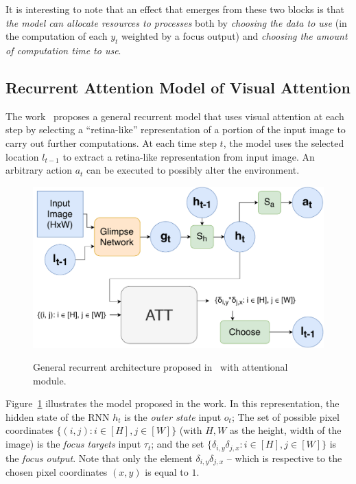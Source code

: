 \documentclass[7pt]{article}
\begin{document}
It is interesting to note that an effect that emerges from these two blocks is that
\emph{the model can allocate resources to processes} both by
\emph{choosing the data to use} (in the computation of each $y_t$ weighted by a focus output)
and \emph{choosing the amount of computation time to use}.

\subsection{Recurrent Attention Model of Visual Attention}
The work~\cite{ref:ram} proposes a general recurrent model that uses visual attention at each step
by selecting a ``retina-like'' representation of a portion of the input image to carry out further computations.
At each time step $t$, the model uses the selected location $l_{t-1}$ to extract a retina-like representation
from input image.
An arbitrary action $a_t$ can be executed to possibly alter the environment.

\begin{figure}[H]
    \centering
    \includegraphics[width=0.6\linewidth]{./img/ram.pdf}
    \label{fig:ram}
    \caption{General recurrent architecture proposed in~\cite{ref:ram} with attentional module.}
\end{figure}

Figure~\ref{fig:ram} illustrates the model proposed in the work.
In this representation, the hidden state of the RNN $h_t$ is the \emph{outer state} input $o_t$;
The set of possible pixel coordinates $\{(i, j): i \in [H], j \in [W]\}$ (with $H, W$ as the height, width of the image)
is the \emph{focus targets} input $\tau_t$;
and the set $\{\delta_{i, y}\delta_{j, x}: i \in [H], j \in [W]\}$ is the \emph{focus output}.
Note that only the element $\delta_{i, y}\delta_{j,x}$ -- which is respective to the chosen pixel coordinates $(x, y)$
is equal to $1$.


\printbibliography
\end{document}

